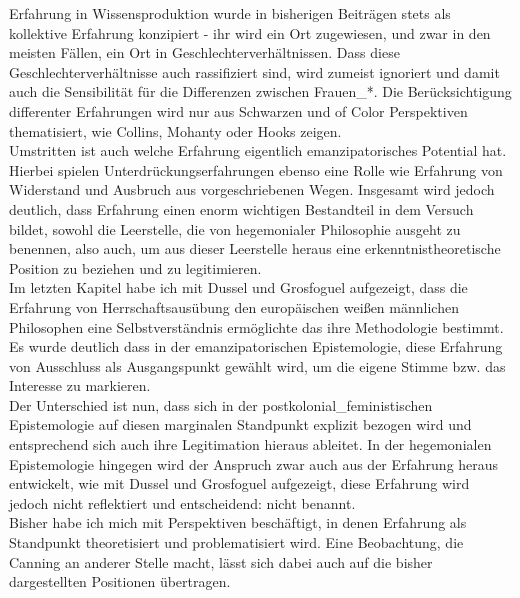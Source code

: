 \noindent Erfahrung in Wissensproduktion wurde in bisherigen Beiträgen stets als
kollektive Erfahrung konzipiert - ihr wird ein Ort zugewiesen, und zwar in den
meisten Fällen, ein Ort in Geschlechterverhältnissen. Dass diese
Geschlechterverhältnisse auch rassifiziert sind, wird zumeist ignoriert und
damit auch die Sensibilität für die Differenzen zwischen Frauen\_*. Die
Berücksichtigung differenter Erfahrungen wird nur aus Schwarzen und of Color
Perspektiven thematisiert, wie Collins, Mohanty oder Hooks zeigen.\\
Umstritten ist auch welche Erfahrung eigentlich emanzipatorisches Potential
hat. Hierbei spielen Unterdrückungserfahrungen ebenso eine Rolle wie Erfahrung
von Widerstand und Ausbruch aus vorgeschriebenen Wegen. Insgesamt wird jedoch
deutlich, dass Erfahrung einen enorm wichtigen Bestandteil in dem Versuch
bildet, sowohl die Leerstelle, die von hegemonialer Philosophie ausgeht zu
benennen, also auch, um aus dieser Leerstelle heraus eine
erkenntnistheoretische Position zu beziehen und zu legitimieren.\\

\noindent Im letzten Kapitel habe ich mit Dussel und Grosfoguel aufgezeigt, dass die
Erfahrung von Herrschaftsausübung den europäischen weißen männlichen
Philosophen eine Selbstverständnis ermöglichte das ihre Methodologie bestimmt.
Es wurde deutlich dass in der emanzipatorischen Epistemologie, diese Erfahrung
von Ausschluss als Ausgangspunkt gewählt wird, um die eigene Stimme bzw. das
Interesse zu markieren. \\
Der Unterschied ist nun, dass sich in der
postkolonial\_feministischen Epistemologie auf diesen marginalen Standpunkt
explizit bezogen wird und entsprechend sich auch ihre Legitimation hieraus
ableitet. In der hegemonialen Epistemologie hingegen wird der Anspruch zwar
auch aus der Erfahrung heraus entwickelt, wie mit Dussel und Grosfoguel
aufgezeigt, diese Erfahrung wird jedoch nicht reflektiert und entscheidend:
nicht benannt.\\
           
\noindent Bisher habe ich mich mit Perspektiven beschäftigt, in denen Erfahrung als
Standpunkt theoretisiert und problematisiert wird. Eine Beobachtung, die
Canning an anderer Stelle\footnotemark {} macht, lässt sich dabei auch
auf die bisher dargestellten Positionen übertragen.\\
 
